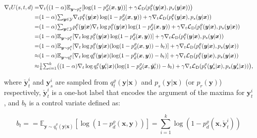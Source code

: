 \documentclass{article}
\newcommand{\OVEC}[1]{\bm{#1}} %
\newcommand{\SVEC}[1]{\check{\bm{#1}}}
\newcommand{\COL}[1]{\mathcal{#1}} %
\newcommand{\UTIL}[1]{U(s,t,d)} %
\newcommand{\EXP}{\mathbb{E}} %
\newcommand{\DTN}{\mathcal{L}_{\rm{D}}}
\newcommand{\fullpstd}[1]{p_{s}(#1|\OVEC{x})}
\newcommand{\abbrptch}{p_{t}^{\varrho}}
\newcommand{\abbrqtch}{q_{t}^{\varrho}}
\newcommand{\fullptch}[1]{p_{t}^{\varrho}(#1|\OVEC{x})}
\newcommand{\fullqtch}[1]{q_{t}^{\varrho}(#1|\OVEC{x})}
\newcommand{\fullpdis}[1]{p_{d}^{\varrho}(\OVEC{x},#1)}
\newcommand{\fullpcls}{p_{r}(\OVEC{y})}
\begin{document}
\begin{small}
\begin{equation*}
\begin{aligned}
\nabla_{t}
\UTIL{}
=
&
\nabla_{t}
\big(
(1-\alpha)\EXP_{\OVEC{y}\sim\abbrptch}[\log(1-\fullpdis{\OVEC{y}})]
+
\gamma\DTN(\fullptch{\OVEC{y}},\fullpstd{\OVEC{y}})
\big)
\\
=
&
(1-\alpha){\textstyle\sum}_{\OVEC{y}\in\COL{Y}}
\nabla_{t}\fullptch{\OVEC{y}}\log(1-\fullpdis{\OVEC{y}})
+
\gamma\nabla_{t}\DTN(\fullptch{\OVEC{y}},\fullpstd{\OVEC{y}})
\\
=
&
(1-\alpha){\textstyle\sum}_{\OVEC{y}\in\COL{Y}}
\fullptch{\OVEC{y}}\nabla_{t}\log\fullptch{\OVEC{y}}\log(1-\fullpdis{\OVEC{y}})
+
\gamma\nabla_{t}\DTN(\fullptch{\OVEC{y}},\fullpstd{\OVEC{y}})
\\
=
&
(1-\alpha)\EXP_{\OVEC{y}\sim\abbrptch}
[\nabla_{t}\log\fullptch{\OVEC{y}}\log(1-\fullpdis{\OVEC{y}})]
+
\gamma\nabla_{t}\DTN(\fullptch{\OVEC{y}},\fullpstd{\OVEC{y}})
\\
=
&
(1-\alpha)\EXP_{\OVEC{y}\sim\abbrptch}
[\nabla_{t}\log\fullptch{\OVEC{y}}(\log(1-\fullpdis{\OVEC{y}})-b_{t})]
+
\gamma\nabla_{t}\DTN(\fullptch{\OVEC{y}},\fullpstd{\OVEC{y}})
\\
\approx
&
(1-\alpha)\EXP_{\OVEC{y}\sim\abbrqtch}
[\nabla_{t}\log\fullqtch{\OVEC{y}}(\log(1-\fullpdis{\OVEC{y}})-b_{t})]
+
\gamma\nabla_{t}\DTN(\fullptch{\OVEC{y}},\fullpstd{\OVEC{y}})
\\
\approx
&
{\textstyle\frac{1}{k}}
{\textstyle\sum}_{i=1}^{k}
\big(
(1-\alpha)
\nabla_{t}\log\fullqtch{\OVEC{y}^{i}_{t}}
(\log(1-\fullpdis{\SVEC{y}^{i}_{t}})-b_{t})
+
\gamma
\nabla_{t}
\DTN(\fullptch{\OVEC{y}^{i}_{s}},\fullpstd{\OVEC{y}^{i}_{s}})
\big)
\text{,}
\\
\end{aligned}
\end{equation*}
\end{small}%
where $\SVEC{y}^{i}_{t}$ and $\OVEC{y}^{i}_{s}$ are sampled from $\fullqtch{\OVEC{y}}$ and $\fullpstd{\OVEC{y}}$ (or $\fullpcls$) respectively, $\SVEC{y}^{i}_{t}$ is a one-hot label that encodes the argument of the maxima for $\OVEC{y}^{i}_{t}$, and $b_{t}$ is a control variate defined as:
\begin{small}
\begin{equation*}
b_{t}
=
=
\EXP_{\OVEC{y}\sim\fullqtch{\OVEC{y}}}
[\log(1-\fullpdis{\OVEC{y}})]
=
{\textstyle\sum}_{i=1}^{k}\log(1-\fullpdis{\SVEC{y}^{i}_{t}})
\end{equation*}
\end{small}%
\end{document}
